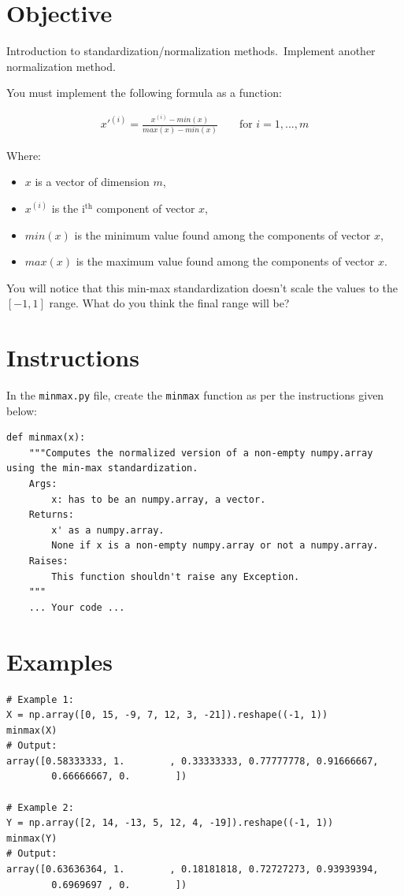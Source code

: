 \documentclass{42-en}
\begin{document}
\section*{Objective}
Introduction to standardization/normalization methods.\
Implement another normalization method.

You must implement the following formula as a function: 

$$
\begin{matrix}
  x'^{(i)} = \frac{x^{(i)} - min(x)}{max(x) - min(x)} & & \text{ for $i = 1, ..., m$}
\end{matrix}
$$

Where:
\begin{itemize}
  \item $x$ is a vector of dimension $m$,
  \item $x^{(i)}$ is the i$^\text{th}$ component of vector $x$,
  \item $min(x)$ is the minimum value found among the components of vector $x$,
  \item $max(x)$ is the maximum value found among the components of vector $x$.
\end{itemize}

You will notice that this min-max standardization doesn't scale the values to the $[-1,1]$ range.
What do you think the final range will be?

\section*{Instructions}
In the \texttt{minmax.py} file, create the \texttt{minmax} function as per the instructions given below:

\begin{verbatim}
def minmax(x):
	"""Computes the normalized version of a non-empty numpy.array using the min-max standardization.
	Args:
		x: has to be an numpy.array, a vector.
	Returns:
		x' as a numpy.array. 
		None if x is a non-empty numpy.array or not a numpy.array.
	Raises:
		This function shouldn't raise any Exception.
	"""
    ... Your code ...
\end{verbatim}

\section*{Examples}
\begin{verbatim}
# Example 1:
X = np.array([0, 15, -9, 7, 12, 3, -21]).reshape((-1, 1))
minmax(X)
# Output:
array([0.58333333, 1.        , 0.33333333, 0.77777778, 0.91666667,
		0.66666667, 0.        ])

# Example 2:
Y = np.array([2, 14, -13, 5, 12, 4, -19]).reshape((-1, 1))
minmax(Y)
# Output:
array([0.63636364, 1.        , 0.18181818, 0.72727273, 0.93939394,
		0.6969697 , 0.        ])
\end{verbatim}
\end{document}
